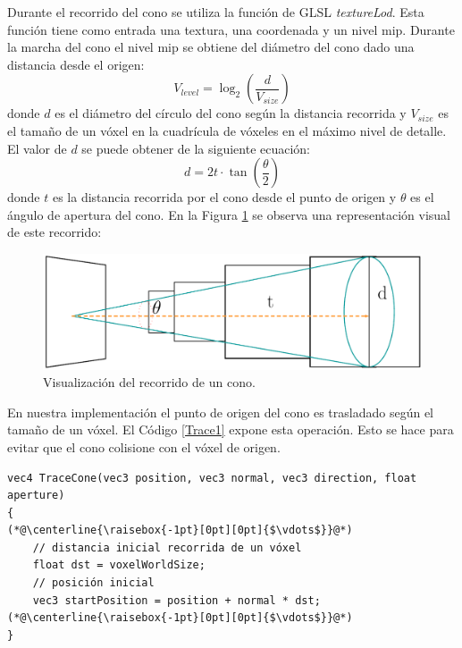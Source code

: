 Durante el recorrido del cono se utiliza la función de GLSL \emph{textureLod}. Esta función tiene como entrada una textura, una coordenada y un nivel mip. Durante la marcha del cono el nivel mip se obtiene del diámetro del cono dado una distancia desde el origen:
\begin{equation}
    V_{level} = \log_2\left(\frac{d}{V_{size}}\right)
\end{equation} donde $d$ es el diámetro del círculo del cono según la distancia recorrida y $V_{size}$ es el tamaño de un vóxel en la cuadrícula de vóxeles en el máximo nivel de detalle. El valor de $d$ se puede obtener de la siguiente ecuación:
\begin{equation}
    d = 2t\cdot\tan\left(\frac{\theta}{2}\right)
\end{equation} donde $t$ es la distancia recorrida por el cono desde el punto de origen y $\theta$ es el ángulo de apertura del cono. En la Figura \ref{fig:cone_trace_impl_fi} se observa una representación visual de este recorrido:
\begin{figure}[H]
    \centering
    \captionsetup{justification=centering}
    \includegraphics[width=.9\linewidth]{media/cone.pdf}
    \caption{Visualización del recorrido de un cono.}
    \label{fig:cone_trace_impl_fi}
\end{figure}

En nuestra implementación el punto de origen del cono es trasladado según el tamaño de un vóxel. El Código \ref{Trace1} expone esta operación. Esto se hace para evitar que el cono colisione con el vóxel de origen.
\\
\begin{lstlisting}[caption={Traslado de origen del cono.}, label=Trace1]
vec4 TraceCone(vec3 position, vec3 normal, vec3 direction, float aperture)
{
(*@\centerline{\raisebox{-1pt}[0pt][0pt]{$\vdots$}}@*)
    // distancia inicial recorrida de un vóxel 
    float dst = voxelWorldSize;
    // posición inicial
    vec3 startPosition = position + normal * dst;
(*@\centerline{\raisebox{-1pt}[0pt][0pt]{$\vdots$}}@*)
}
\end{lstlisting}

